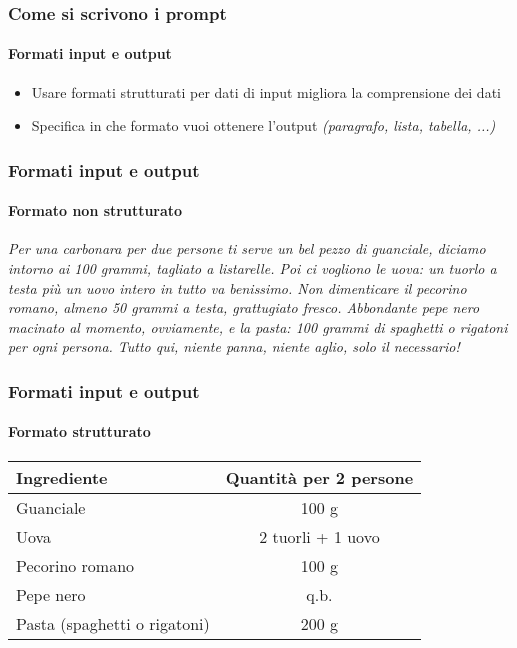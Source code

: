 \begin{contentframe}
    \frametitle{Come si scrivono i prompt}
    \framesubtitle{Formati input e output}

    \begin{itemize}
        \item Usare formati strutturati per dati di input migliora la comprensione dei dati

        \bigskip
        \item Specifica in che formato vuoi ottenere l'output \textit{(paragrafo, lista, tabella, ...)}
    \end{itemize}
\end{contentframe}

\begin{exampleframe}
    \frametitle{Formati input e output}
    \framesubtitle{Formato non strutturato}

    \justifying
    \textit{Per una carbonara per due persone ti serve un bel pezzo di guanciale, diciamo intorno ai 100 grammi, tagliato a listarelle. Poi ci vogliono le uova: un tuorlo a testa più un uovo intero in tutto va benissimo. Non dimenticare il pecorino romano, almeno 50 grammi a testa, grattugiato fresco. Abbondante pepe nero macinato al momento, ovviamente, e la pasta: 100 grammi di spaghetti o rigatoni per ogni persona. Tutto qui, niente panna, niente aglio, solo il necessario!}
\end{exampleframe}

\begin{exampleframe}
    \frametitle{Formati input e output}
    \framesubtitle{Formato strutturato}

    \begin{table}[h!]
        \centering
        \begin{tabular}{lc}
            \toprule
            \textbf{Ingrediente}            & \textbf{Quantità per 2 persone}   \\ 
            \midrule
            Guanciale                       & 100 g                             \\ 
            Uova                            & 2 tuorli + 1 uovo                 \\ 
            Pecorino romano                 & 100 g                             \\ 
            Pepe nero                       & q.b.                              \\ 
            Pasta (spaghetti o rigatoni)    & 200 g                             \\ 
            \bottomrule
        \end{tabular}
    \end{table}
\end{exampleframe}

